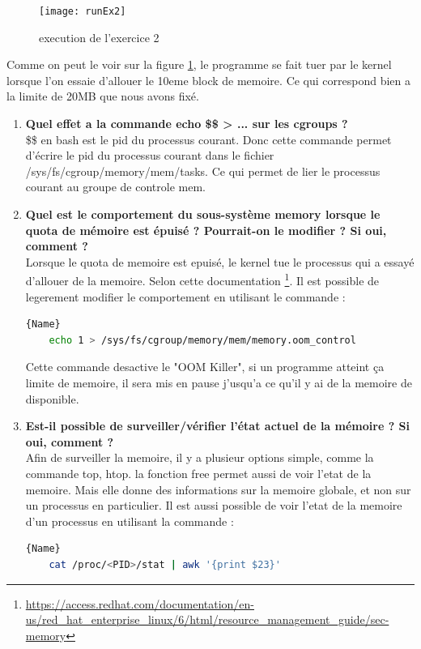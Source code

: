 \documentclass[
	a4paper, %
	10pt, %
]{CSUniSchoolLabReport}
\begin{document}
\begin{figure}[H]
	\centering
	\texttt{[image: runEx2]}
	\caption{execution de l'exercice 2}
	\label{fig:ex2}
\end{figure}

Comme on peut le voir sur la figure \ref{fig:ex2}, le programme se fait tuer par le kernel lorsque l'on essaie d'allouer le 10eme block de memoire.
Ce qui correspond bien a la limite de 20MB que nous avons fixé.

\begin{enumerate}[label=\textbf{\arabic*}]
	\item \textbf{Quel effet a la commande echo \$\$ > ... sur les cgroups ?}\\
\$\$ en bash est le pid du processus courant. Donc cette commande permet d'écrire le pid du processus courant dans le fichier /sys/fs/cgroup/memory/mem/tasks. Ce qui permet de lier le processus courant au groupe de controle mem.
	
	\item \textbf{Quel est le comportement du sous-système memory lorsque le quota de mémoire est épuisé ? Pourrait-on le modifier ? Si oui, comment ?}\\
Lorsque le quota de memoire est epuisé, le kernel tue le processus qui a essayé d'allouer de la memoire.
Selon cette documentation \footnote{\href{https://access.redhat.com/documentation/en-us/red_hat_enterprise_linux/6/html/resource_management_guide/sec-memory}{https://access.redhat.com/documentation/en-us/red\_hat\_enterprise\_linux/6/html/resource\_management\_guide/sec-memory}}.
Il est possible de legerement modifier le comportement en utilisant le commande :
\begin{lstlisting}[language=bash, firstnumber=1]{Name}
	echo 1 > /sys/fs/cgroup/memory/mem/memory.oom_control
\end{lstlisting}
Cette commande desactive le "OOM Killer", si un programme atteint ça limite de memoire, il sera mis en pause j'usqu'a ce qu'il y ai de la memoire de disponible.

	\item \textbf{Est-il possible de surveiller/vérifier l’état actuel de la mémoire ? Si oui, comment ?}\\
Afin de surveiller la memoire, il y a plusieur options simple, comme la commande top, htop.
la fonction free permet aussi de voir l'etat de la memoire. Mais elle donne des informations sur la memoire globale, et non sur un processus en particulier.
Il est aussi possible de voir l'etat de la memoire d'un processus en utilisant la commande :
\begin{lstlisting}[language=bash, firstnumber=1]{Name}
	cat /proc/<PID>/stat | awk '{print $23}'
\end{lstlisting}
\end{enumerate}
\end{document}
